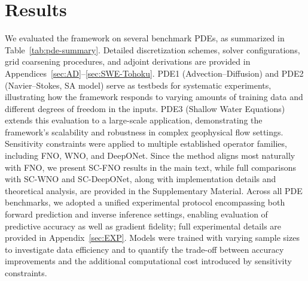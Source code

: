 \section{Results}
We evaluated the framework on several benchmark PDEs, as summarized in Table~\ref{tab:pde-summary}. Detailed discretization schemes, solver configurations, grid coarsening procedures, and adjoint derivations are provided in Appendices~\ref{sec:AD}--\ref{sec:SWE-Tohoku}. PDE1 (Advection--Diffusion) and PDE2 (Navier--Stokes, SA model) serve as testbeds for systematic experiments, illustrating how the framework responds to varying amounts of training data and different degrees of freedom in the inputs. PDE3 (Shallow Water Equations) extends this evaluation to a large-scale application, demonstrating the framework’s scalability and robustness in complex geophysical flow settings. Sensitivity constraints were applied to multiple established operator families, including FNO, WNO, and DeepONet. Since the method aligns most naturally with FNO, we present SC-FNO results in the main text, while full comparisons with SC-WNO and SC-DeepONet, along with implementation details and theoretical analysis, are provided in the Supplementary Material. Across all PDE benchmarks, we adopted a unified experimental protocol encompassing both forward prediction and inverse inference settings, enabling evaluation of predictive accuracy as well as gradient fidelity; full experimental details are provided in Appendix~\ref{sec:EXP}. Models were trained with varying sample sizes to investigate data efficiency and to quantify the trade-off between accuracy improvements and the additional computational cost introduced by sensitivity constraints.


